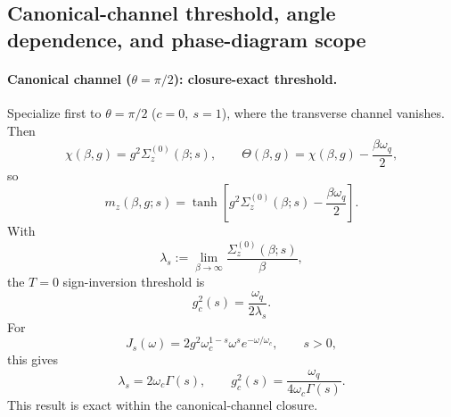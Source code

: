 \subsection{Canonical-channel threshold, angle dependence, and phase-diagram scope}
\label{subsec:ground_state_phase_transitions}

\paragraph{Canonical channel (\(\theta=\pi/2\)): closure-exact threshold.}
Specialize first to \(\theta=\pi/2\) (\(c=0,\ s=1\)), where the transverse channel vanishes. Then
\begin{equation}
  \chi(\beta,g)=g^2\Sigma_z^{(0)}(\beta;s),
  \qquad
  \Theta(\beta,g)=\chi(\beta,g)-\frac{\beta\omega_q}{2},
\end{equation}
so
\begin{equation}
  m_z(\beta,g;s)=\tanh\!\left[g^2\Sigma_z^{(0)}(\beta;s)-\frac{\beta\omega_q}{2}\right].
\end{equation}
With
\begin{equation}
  \lambda_s:=\lim_{\beta\to\infty}\frac{\Sigma_z^{(0)}(\beta;s)}{\beta},
\end{equation}
the \(T=0\) sign-inversion threshold is
\begin{equation}
  g_c^2(s)=\frac{\omega_q}{2\lambda_s}.
  \label{eq:gc_exact_lambda}
\end{equation}
For
\begin{equation}
  J_s(\omega)=2g^2\omega_c^{1-s}\omega^s e^{-\omega/\omega_c}, \qquad s>0,
\end{equation}
this gives
\begin{equation}
  \lambda_s=2\omega_c\Gamma(s),
  \qquad
  g_c^2(s)=\frac{\omega_q}{4\omega_c\Gamma(s)}.
  \label{eq:gc_exact_gamma}
\end{equation}
This result is exact within the canonical-channel closure.

